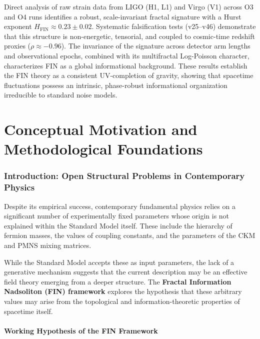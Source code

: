 \documentclass[11pt,a4paper]{book}
\theoremstyle{remark}
\begin{document}
Direct analysis of raw strain data from LIGO (H1, L1) and Virgo (V1) across O3 and O4 runs identifies a robust, scale-invariant fractal signature with a Hurst exponent $H_{\text{FIN}} \approx 0.23 \pm 0.02$. Systematic falsification tests (v25--v46) demonstrate that this structure is non-energetic, tensorial, and coupled to cosmic-time redshift proxies ($\rho \approx -0.96$). The invariance of the signature across detector arm lengths and observational epochs, combined with its multifractal Log-Poisson character, characterizes FIN as a global informational background. These results establish the FIN theory as a consistent UV-completion of gravity, showing that spacetime fluctuations possess an intrinsic, phase-robust informational organization irreducible to standard noise models.

\tableofcontents
\newpage

\part{Conceptual Motivation and Methodological Foundations}

\section{Introduction: Open Structural Problems in Contemporary Physics}

Despite its empirical success, contemporary fundamental physics relies on a significant number of experimentally fixed parameters whose origin is not explained within the Standard Model itself. These include the hierarchy of fermion masses, the values of coupling constants, and the parameters of the CKM and PMNS mixing matrices.

While the Standard Model accepts these as input parameters, the lack of a generative mechanism suggests that the current description may be an effective field theory emerging from a deeper structure. The \textbf{Fractal Information Nadsoliton (FIN) framework} explores the hypothesis that these arbitrary values may arise from the topological and information-theoretic properties of spacetime itself.

\subsection{Working Hypothesis of the FIN Framework}
\end{document}

